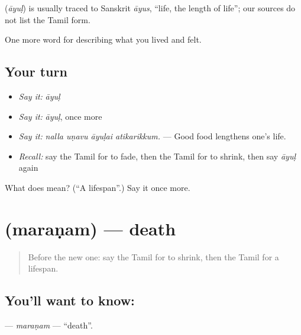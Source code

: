 \begin{cousinweb}
\textbf{} (\emph{āyuḷ}) is usually traced to Sanskrit \emph{āyus}, \textquotedblleft{}life, the length of life\textquotedblright{}; our sources do not list the Tamil form.
\end{cousinweb}

\begin{grammarlens}[title={What you've built}]
One more word for describing what you lived and felt.
\end{grammarlens}

\subsection*{Your turn}
\begin{itemize}
\raggedright
  \item \emph{Say it:} \emph{āyuḷ}
  \item \emph{Say it:} \emph{āyuḷ}, once more
  \item \emph{Say it:} \emph{nalla uṇavu āyuḷai atikarikkum.} — Good food lengthens one’s life.
  \item \emph{Recall:} say the Tamil for to fade, then the Tamil for to shrink, then say \emph{āyuḷ} again
\end{itemize}

\begin{tcolorbox}[breakable,colback=teal!4,colframe=teal!35!black,title={Before you move on}]
What does  mean? (\textquotedblleft{}A lifespan\textquotedblright{}.) Say it once more.
\end{tcolorbox}
\section[\texorpdfstring{\ta{மரணம்} (maraṇam)}{மரணம் (maraṇam)}]{ (maraṇam) — death}

\label{lesson:TA-C505-maranam}



\begin{quote}
Before the new one: say the Tamil for to shrink, then the Tamil for a lifespan.
\end{quote}

\subsection*{You'll want to know: }
\textbf{} — \emph{maraṇam} — \textquotedblleft{}death\textquotedblright{}.

